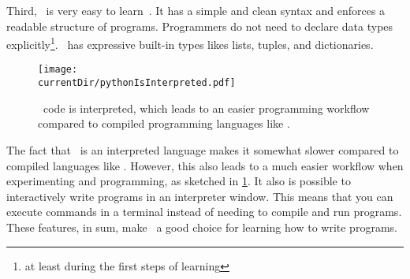 Third, \python\ is very easy to learn~\cite{GPBS2006WCTIPIHSUP,VR1999CPFERPASEFTPOT}.
It has a simple and clean syntax and enforces a readable structure of programs.
Programmers do not need to declare data types explicitly\footnote{at least during the first steps of learning}.
\python\ has expressive built-in types likes lists, tuples, and dictionaries.
%
\begin{figure}%
\centering%
\texttt{[image: \\currentDir/pythonIsInterpreted.pdf]}%
\caption{\python\ code is interpreted, which leads to an easier programming workflow compared to compiled programming languages like .}%
\label{fig:pythonIsInterpreted}%
\end{figure}%
%
The fact that \python\ is an interpreted language makes it somewhat slower compared to compiled languages like .
However, this also leads to a much easier workflow when experimenting and programming, as sketched in \cref{fig:pythonIsInterpreted}.
It also is possible to interactively write programs in an interpreter window.
This means that you can execute commands in a \gls{terminal} instead of needing to compile and run programs.
These features, in sum, make \python\ a good choice for learning how to write programs.%
%
\endhsection%
%
